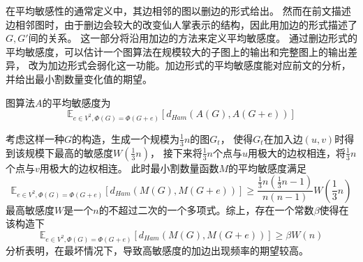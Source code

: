 在平均敏感性的通常定义中，其边相邻的图以删边的形式给出。\cite{varma2023average}
然而在前文描述边相邻图时，由于删边会较大的改变仙人掌表示的结构，因此用加边的形式描述了$G,G'$间的关系。
这一部分将沿用加边的方法来定义平均敏感度。
通过删边形式的平均敏感度，可以估计一个图算法在规模较大的子图上的输出和完整图上的输出差异，
改为加边形式会弱化这一功能。加边形式的平均敏感度能对应前文的分析，并给出最小割数量变化值的期望。

\begin{definition}
  图算法$A$的平均敏感度为
  \begin{equation*}
    \mathbb E_{e\in V^2,\Phi(G)=\Phi(G+e)}[d_{Ham}(A(G),A(G+e))]
  \end{equation*}
\end{definition}

考虑这样一种$G$的构造，生成一个规模为$\frac 13n$的图$G_t$，
使得$G_t$在加入边$(u,v)$时得到该规模下最高的敏感度$W(\frac 13n)$，
接下来将$\frac 13n$个点与$u$用极大的边权相连，将$\frac 13n$个点与$v$用极大的边权相连。
此时最小割数量函数$M$的平均敏感度满足
\begin{equation*}
  \mathbb E_{e\in V^2,\Phi(G)=\Phi(G+e)}[d_{Ham}(M(G),M(G+e))]\geq \frac{\frac 13n(\frac 13n-1)}{n(n-1)}W(\frac 13n)
\end{equation*}
最高敏感度$W$是一个$n$的不超过二次的一个多项式。综上，存在一个常数$\beta$使得在该构造下
\begin{equation*}
  \mathbb E_{e\in V^2,\Phi(G)=\Phi(G+e)}[d_{Ham}(M(G),M(G+e))]\geq \beta W(n)
\end{equation*}
分析表明，在最坏情况下，导致高敏感度的加边出现频率的期望较高。